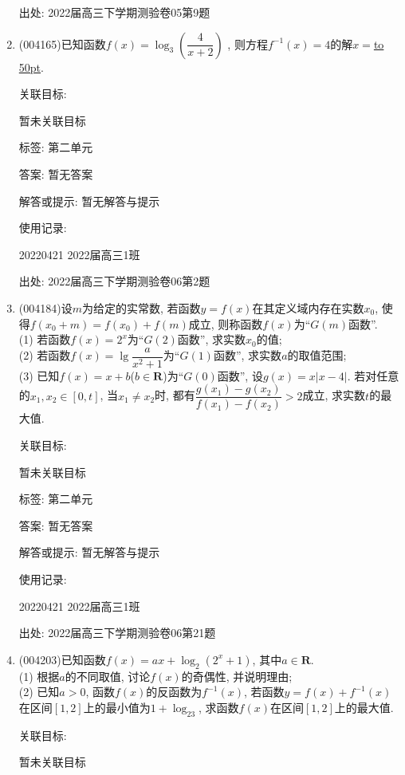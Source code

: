 \documentclass[10pt,a4paper]{article}
\newcommand{\blank}[1]{\underline{\hbox to #1pt{}}}
\begin{document}
\begin{enumerate}[1.]
出处: 2022届高三下学期测验卷05第9题
\item { (004165)}已知函数$f(x)=\log_3(\dfrac 4{x+2})$ , 则方程$f^{-1}(x)=4$的解$x=$\blank{50}.


关联目标:

暂未关联目标



标签: 第二单元

答案: 暂无答案

解答或提示: 暂无解答与提示

使用记录:

20220421	2022届高三1班	


出处: 2022届高三下学期测验卷06第2题
\item { (004184)}设$m$为给定的实常数, 若函数$y=f(x)$在其定义域内存在实数$x_0$, 使得$f(x_0+m)=f(x_0)+f(m)$成立, 则称函数$f(x)$为``$G(m)$函数''.\\
(1) 若函数$f(x)=2^x$为``$G(2)$函数'', 求实数$x_0$的值;\\
(2) 若函数$f(x)=\lg \dfrac a{x^2+1}$为``$G(1)$函数'', 求实数$a$的取值范围;\\
(3) 已知$f(x)=x+b$($b\in \mathbf{R}$)为``$G(0)$函数'', 设$g(x)=x|x-4|$. 若对任意的$x_1,x_2\in[0,t]$, 当$x_1\ne x_2$时, 都有$\dfrac{g(x_1)-g(x_2)}{f(x_1)-f(x_2)}>2$成立, 求实数$t$的最大值.


关联目标:

暂未关联目标



标签: 第二单元

答案: 暂无答案

解答或提示: 暂无解答与提示

使用记录:

20220421	2022届高三1班			


出处: 2022届高三下学期测验卷06第21题
\item { (004203)}已知函数$f(x)=ax+\log_2(2^x+1)$, 其中$a\in \mathbf{R}$.\\
(1) 根据$a$的不同取值, 讨论$f(x)$的奇偶性, 并说明理由;\\
(2) 已知$a>0$, 函数$f(x)$的反函数为$f^{-1}(x)$, 若函数$y=f(x)+f^{-1}(x)$在区间$[1,2]$上的最小值为$1+\log_23$, 求函数$f(x)$在区间$[1,2]$上的最大值.


关联目标:

暂未关联目标




\end{enumerate}
\end{document}
